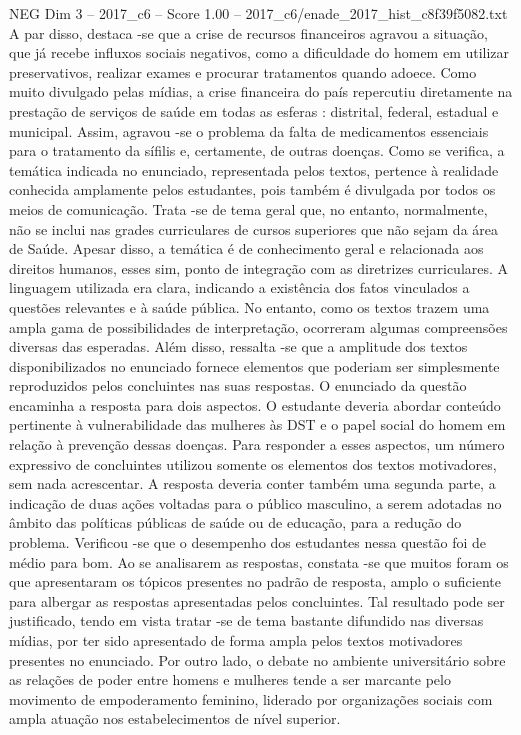 \begin{textsample}{NEG Dim 3 – 2017\_c6 – Score 1.00 – 2017\_c6/enade\_2017\_hist\_c8f39f5082.txt}
A par disso, destaca -se que a crise de recursos financeiros agravou a situação, que já recebe influxos sociais negativos, como a dificuldade do homem em utilizar preservativos, realizar exames e procurar tratamentos quando adoece.
Como muito divulgado pelas mídias, a crise financeira do país repercutiu diretamente na prestação de serviços de saúde em todas as esferas : distrital, federal, estadual e municipal.
Assim, agravou -se o problema da falta de medicamentos essenciais para o tratamento da sífilis e, certamente, de outras doenças.
Como se verifica, a temática indicada no enunciado, representada pelos textos, pertence à realidade conhecida amplamente pelos estudantes, pois também é divulgada por todos os meios de comunicação.
Trata -se de tema geral que, no entanto, normalmente, não se inclui nas grades curriculares de cursos superiores que não sejam da área de Saúde.
Apesar disso, a temática é de conhecimento geral e relacionada aos direitos humanos, esses sim, ponto de integração com as diretrizes curriculares.
A linguagem utilizada era clara, indicando a existência dos fatos vinculados a questões relevantes e à saúde pública.
No entanto, como os textos trazem uma ampla gama de possibilidades de interpretação, ocorreram algumas compreensões diversas das esperadas.
Além disso, ressalta -se que a amplitude dos textos disponibilizados no enunciado fornece elementos que poderiam ser simplesmente reproduzidos pelos concluintes nas suas respostas.
O enunciado da questão encaminha a resposta para dois aspectos.
O estudante deveria abordar conteúdo pertinente à vulnerabilidade das mulheres às DST e o papel social do homem em relação à prevenção dessas doenças.
Para responder a esses aspectos, um número expressivo de concluintes utilizou somente os elementos dos textos motivadores, sem nada acrescentar.
A resposta deveria conter também uma segunda parte, a indicação de duas ações voltadas para o público masculino, a serem adotadas no âmbito das políticas públicas de saúde ou de educação, para a redução do problema.
Verificou -se que o desempenho dos estudantes nessa questão foi de médio para bom.
Ao se analisarem as respostas, constata -se que muitos foram os que apresentaram os tópicos presentes no padrão de resposta, amplo o suficiente para albergar as respostas apresentadas pelos concluintes.
Tal resultado pode ser justificado, tendo em vista tratar -se de tema bastante difundido nas diversas mídias, por ter sido apresentado de forma ampla pelos textos motivadores presentes no enunciado.
Por outro lado, o debate no ambiente universitário sobre as relações de poder entre homens e mulheres tende a ser marcante pelo movimento de empoderamento feminino, liderado por organizações sociais com ampla atuação nos estabelecimentos de nível superior.

\end{textsample}

